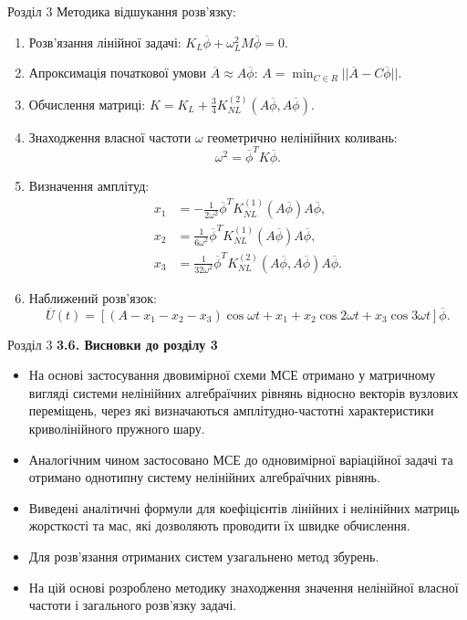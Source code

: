 \documentclass[8pt]{beamer}
\numberwithin{figure}{section}
\numberwithin{equation}{section}
\numberwithin{table}{section}
\begin{document}
\begin{frame}{Розділ 3}
Методика відшукання розв'язку:
\begin{enumerate}
	\item Розв’язання лінійної задачі:
	$K_L\overline{\phi}+\omega_L^2 M \overline{\phi}=0$.
 
	\item Апроксимація початкової умови $\overline{A}\approx A\overline{\phi}$: 
	$\displaystyle A=\min_{C \in R} ||\overline{A}-C\overline{\phi}||$.
	\item Обчислення матриці:
	$K = K_L + \frac34 K_{NL}^{(2)}\left( A\overline{\phi},A\overline{\phi} \right) $.
	\item Знаходження власної частоти $\omega$ геометрично нелінійних коливань:
	\[\omega^2=\overline{\phi}^T K \overline{\phi}.\]
	\item Визначення амплітуд:
 \begin{align*}
x_1&=-\frac{1}{2\omega ^2}\overline{\phi}^T K_{NL}^{(1)}\left( A\overline{\phi} \right) A\overline{\phi},\\
x_2&=\frac{1}{6\omega ^2}\overline{\phi}^T K_{NL}^{(1)}\left( A\overline{\phi} \right) A\overline{\phi},\\
x_3&=\frac{1}{32\omega ^2}\overline{\phi}^T K_{NL}^{(2)}\left( A\overline{\phi},A\overline{\phi} \right) A\overline{\phi}.
\end{align*}
	\item Наближений розв'язок:
	\[
	\overline{U}\left(t\right)=\left[\left(A-x_1-x_2-x_3\right)\cos \omega t + x_1+x_2\cos 2 \omega t+x_3\cos 3 \omega t\right]\overline{\phi}.
	\]
\end{enumerate}
\end{frame}

\begin{frame}{Розділ 3}
\textbf{3.6. Висновки до розділу 3}
\\
\vspace{1em}
\begin{itemize}
\item На основі застосування двовимірної схеми МСЕ отримано у матричному вигляді системи нелінійних алгебраїчних рівнянь відносно векторів вузлових переміщень, через які визначаються амплітудно-частотні характеристики криволінійного пружного шару.
\item Аналогічним чином застосовано МСЕ до одновимірної варіаційної задачі та отримано однотипну систему нелінійних алгебраїчних рівнянь.
\item Виведені аналітичні формули для коефіцієнтів лінійних і нелінійних матриць жорсткості та мас, які дозволяють проводити їх швидке обчислення.
\item Для розв'язання отриманих систем узагальнено метод збурень.
\item На цій основі розроблено методику знаходження значення нелінійної власної частоти і загального розв'язку задачі. 
\end{itemize}

\end{frame}
\end{document}

